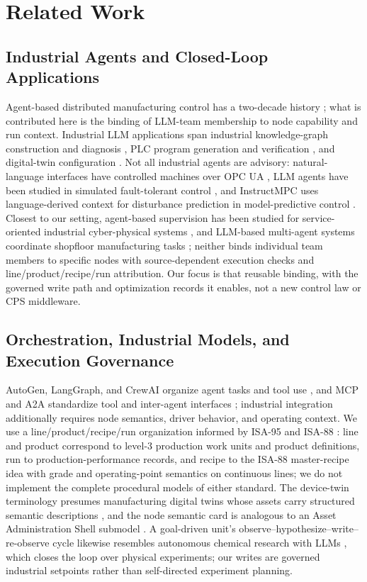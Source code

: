 \section{Related Work}
\subsection{Industrial Agents and Closed-Loop Applications}
Agent-based distributed manufacturing control has a two-decade history
\cite{leitao2009agentbased}; what is contributed here is the binding of LLM-team
membership to node capability and run context. Industrial LLM applications span
industrial knowledge-graph construction \cite{zhang2026comaikg} and diagnosis
\cite{liu2024kgdiag}, PLC program generation and verification
\cite{liu2026agents4plc,fakih2024llm4plc}, and digital-twin configuration
\cite{xia2024llmsim}. Not all industrial agents are advisory: natural-language interfaces have controlled machines over OPC UA \cite{hofmann2025nlc}, LLM
agents have been studied in simulated fault-tolerant control \cite{vyas2026ftc},
and InstructMPC uses language-derived context for disturbance prediction in
model-predictive control \cite{wu2025instructmpc}. Closest to our setting,
agent-based supervision has been studied for service-oriented industrial
cyber-physical systems \cite{biskupovic2025supervision}, and LLM-based multi-agent
systems coordinate shopfloor manufacturing tasks \cite{zhao2026shopfloor}; neither
binds individual team members to specific nodes with source-dependent execution
checks and line/product/recipe/run attribution. Our focus is that reusable binding,
with the governed write path and optimization records it enables, not a new control
law or CPS middleware.

\subsection{Orchestration, Industrial Models, and Execution Governance}
AutoGen, LangGraph, and CrewAI organize agent tasks and tool use
\cite{wu2023autogen,langgraph2024,crewai2024}, and MCP and A2A standardize tool and
inter-agent interfaces \cite{mcp2024,a2a2025}; industrial integration additionally
requires node semantics, driver behavior, and operating context. We use a
line/product/recipe/run organization informed by ISA-95 and ISA-88
\cite{isa95,isa88}: line and product correspond to level-3 production work units and
product definitions, run to production-performance records, and recipe to the ISA-88
master-recipe idea with grade and operating-point semantics on continuous lines;
we do not implement the complete procedural
models of either standard. The device-twin terminology presumes manufacturing
digital twins whose assets carry structured semantic descriptions
\cite{nee2019digital}, and the node semantic card is analogous to an Asset
Administration Shell submodel \cite{iec63278}. A goal-driven unit's
observe--hypothesize--write--re-observe cycle likewise resembles autonomous chemical
research with LLMs \cite{boiko2023autonomous}, which closes the loop over physical
experiments; our writes are governed industrial setpoints rather than self-directed
experiment planning.

